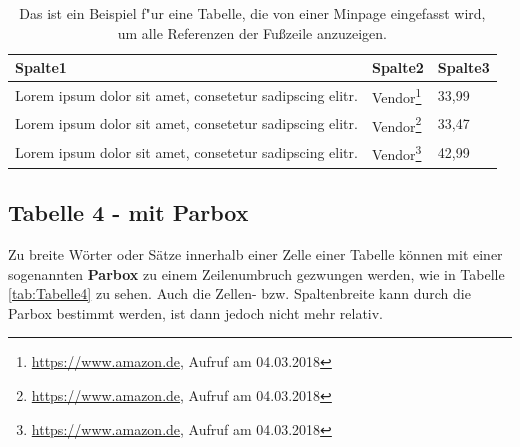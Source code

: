 \FloatBarrier
{}
\begin{table}[H]
\begin{minipage}{\textwidth}
\begin{tabularx}{\textwidth}{ago}
\textbf{Spalte1} &  \textbf{Spalte2} & \textbf{Spalte3}\\
\hline

Lorem ipsum dolor sit amet, consetetur sadipscing elitr. & Vendor\footnote{\url{https://www.amazon.de}, Aufruf am 04.03.2018} & 33,99  \\ \hline

Lorem ipsum dolor sit amet, consetetur sadipscing elitr. & Vendor\footnote{\url{https://www.amazon.de}, Aufruf am 04.03.2018} & 33,47 \\ \hline

Lorem ipsum dolor sit amet, consetetur sadipscing elitr. & Vendor\footnote{\url{https://www.amazon.de}, Aufruf am 04.03.2018} & 42,99 \\ \hline 

\end{tabularx}
\caption[Minipage in einer Tabelle]{Das ist ein Beispiel f"ur eine Tabelle, die von einer Minpage eingefasst wird, um alle Referenzen der Fußzeile anzuzeigen.}
\label{tab:Tabelle3}
\end{minipage}
\end{table}
\FloatBarrier


\subsection{Tabelle 4 - mit Parbox}
\label{subsection:Tabelle4}
Zu breite Wörter oder Sätze innerhalb einer Zelle einer Tabelle können mit einer sogenannten \textbf{Parbox} zu einem Zeilenumbruch gezwungen werden, wie in Tabelle \ref{tab:Tabelle4} zu sehen. Auch die Zellen- bzw. Spaltenbreite kann durch die Parbox bestimmt werden, ist dann jedoch nicht mehr relativ.


